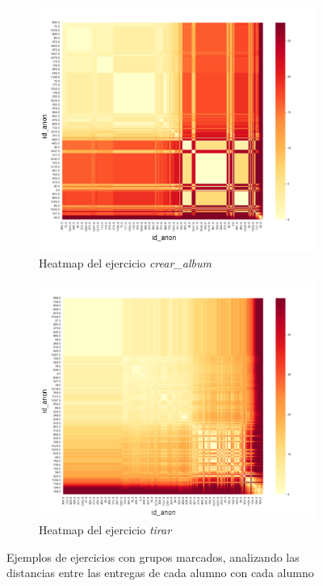 \documentclass[11pt,a4paper,twoside,openany]{tesis}
\begin{document}
\begin{figure}[H]
    \centering
    \begin{subfigure}{0.45\textwidth}
        \includegraphics[width=\linewidth]{imagenes/heatmap-1-crear album.png}
        \caption{Heatmap del ejercicio \emph{crear\_album}}
        \label{fig:figura1}
    \end{subfigure}
    \hfill
    \begin{subfigure}{0.45\textwidth}
        \includegraphics[width=\linewidth]{imagenes/heatmap-1-tirar.png}
        \caption{Heatmap del ejercicio \emph{tirar}}
        \label{fig:figura2}
    \end{subfigure}
    \caption{Ejemplos de ejercicios con grupos marcados, analizando las distancias entre las entregas de cada alumno con cada alumno}
    \label{fig:figuras_juntas}
\end{figure}
\end{document}
